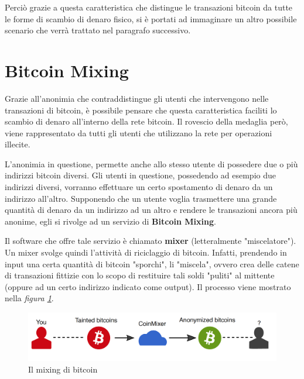 Perciò grazie a questa caratteristica che distingue le transazioni bitcoin da tutte le forme di scambio di denaro fisico, si è portati ad immaginare un altro possibile scenario che verrà trattato nel paragrafo successivo.

\section{Bitcoin Mixing}

Grazie all'anonimia che contraddistingue gli utenti che intervengono nelle transazioni di bitcoin, è possibile pensare che questa caratteristica faciliti lo scambio di denaro all'interno della rete bitcoin. Il rovescio della medaglia però, viene rappresentato da tutti gli utenti che utilizzano la rete per operazioni illecite.

L'anonimia in questione, permette anche allo stesso utente di possedere due o più indirizzi bitcoin diversi. Gli utenti in questione, possedendo ad esempio due indirizzi diversi, vorranno effettuare un certo spostamento di denaro da un indirizzo all'altro. Supponendo che un utente voglia trasmettere una grande quantità di denaro da un indirizzo ad un altro e rendere le transazioni ancora più anonime, egli si rivolge ad un servizio di \textbf{Bitcoin Mixing}.

Il software che offre tale servizio è chiamato \textbf{mixer} (letteralmente "miscelatore"). Un mixer svolge quindi l'attività di riciclaggio di bitcoin. Infatti, prendendo in input una certa quantità di bitcoin "sporchi", li "miscela", ovvero crea delle catene di transazioni fittizie con lo scopo di restituire tali soldi "puliti" al mittente (oppure ad un certo indirizzo indicato come output). Il processo viene mostrato nella \textit{figura \ref{fig:mixingschema}}.

\begin{figure}[htbp]
	\centering
	\includegraphics[width = \linewidth]{figure/mixingschema}
	\caption{Il mixing di bitcoin \cite{coinmixer}}\label{fig:mixingschema}
\end{figure}

